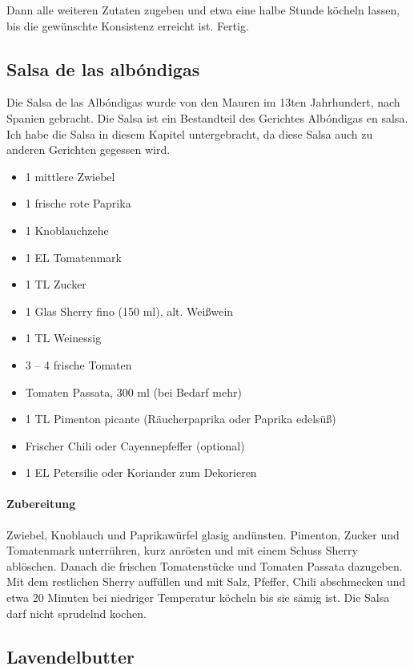 Dann alle weiteren Zutaten zugeben und etwa eine halbe Stunde köcheln 
lassen, bis die gewünschte Konsistenz erreicht ist. Fertig.

\subsection{Salsa de las albóndigas}\label{SalsaAlbondigas}

Die Salsa de las Albóndigas wurde von den Mauren im 13ten Jahrhundert, nach 
Spanien gebracht. Die Salsa ist ein Bestandteil des 
Gerichtes Albóndigas en salsa. Ich habe die Salsa in diesem Kapitel 
untergebracht, da diese Salsa auch zu anderen Gerichten gegessen 
wird.

\begin{itemize}[noitemsep]
	\item 1 mittlere Zwiebel
	\item 1 frische rote Paprika
	\item 1 Knoblauchzehe
	\item 1 EL Tomatenmark
	\item 1 TL Zucker
	\item 1 Glas Sherry fino (150 ml), alt. Weißwein 
	\item 1 TL Weinessig
	\item 3 – 4 frische Tomaten
	\item Tomaten Passata, 300 ml (bei Bedarf mehr)
	\item 1 TL Pimenton picante (Räucherpaprika oder Paprika edelsüß)
	\item Frischer Chili oder Cayennepfeffer (optional)
	\item 1 EL Petersilie oder Koriander zum Dekorieren
\end{itemize}

\paragraph{Zubereitung}

Zwiebel, Knoblauch und Paprikawürfel glasig andünsten. Pimenton, Zucker und 
Tomatenmark 
unterrühren, kurz anrösten und mit einem 
Schuss Sherry ablöschen. Danach die frischen Tomatenstücke und Tomaten 
Passata 
dazugeben. Mit dem restlichen Sherry auffüllen und 
mit Salz, Pfeffer, Chili abschmecken und etwa 20 Minuten bei niedriger 
Temperatur köcheln bis 
sie sämig ist. Die Salsa darf nicht 
sprudelnd kochen.

\subsection{Lavendelbutter}\label{LavButter}

